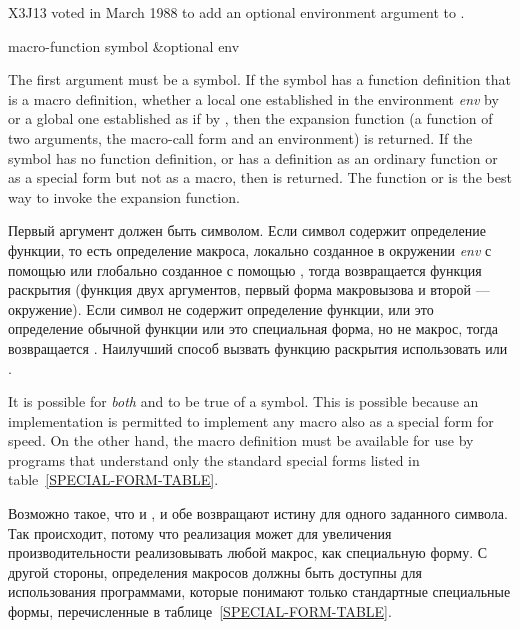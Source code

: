 \begin{newer}
X3J13 voted in March 1988 
to add an optional environment argument to .

\begin{defun}[Function]
macro-function symbol &optional env

The first argument must be a symbol.  If the symbol has a function definition
that is a macro definition, whether a local one established in the
environment \emph{env} by  or a global one established as
if by ,
then the expansion function
(a function of two arguments, the macro-call form and an environment)
is returned.
If the symbol has no function definition, or has a definition
as an ordinary function or as a special form but not as a macro, then
{\false} is returned.  The function  or 
is the best way to invoke the expansion function.

Первый аргумент должен быть символом. Если символ содержит определение функции,
то есть определение макроса, локально созданное в окружении \emph{env} с помощью
 или глобально созданное с помощью , тогда
возвращается функция раскрытия (функция двух аргументов, первый форма
макровызова и второй --- окружение).
Если символ не содержит определение функции, или это определение обычной функции
или это специальная форма, но не макрос, тогда возвращается {\false}. 
Наилучший способ вызвать функцию раскрытия использовать
 или .

It is possible for \emph{both}  and 
to be true of a symbol.  This is possible because an implementation is
permitted to implement any macro also as a special form for speed.
On the other hand, the macro definition must be available
for use by programs that understand only the standard special forms
listed in table~\ref{SPECIAL-FORM-TABLE}.

Возможно такое, что и , и  обе возвращают
истину для одного заданного символа. Так происходит, потому что реализация может
для увеличения производительности реализовывать любой макрос, как специальную
форму.
С другой стороны, определения макросов должны быть доступны для использования
программами, которые понимают только стандартные специальные формы,
перечисленные в таблице~\ref{SPECIAL-FORM-TABLE}.


\end{defun}
\end{newer}
